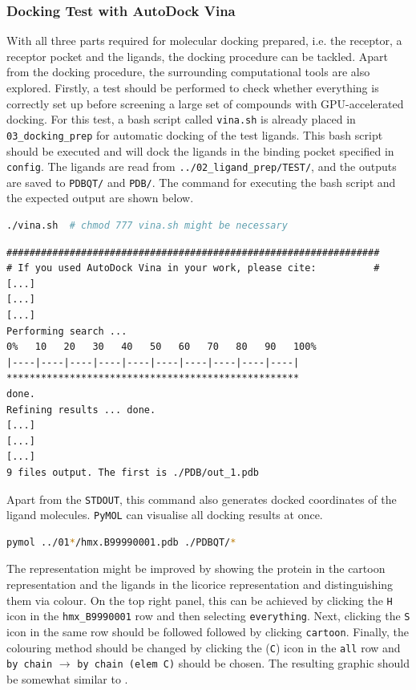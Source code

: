 \documentclass[9pt,tutorial]{livecoms}
\newcommand{\code}[1]{\colorbox{light-gray}{\texttt{#1}}}
\begin{document}
\subsubsection*{Docking Test with AutoDock Vina}
With all three parts required for molecular docking prepared, i.e. the receptor, a receptor pocket and the ligands, the docking procedure can be tackled. Apart from the docking procedure, the surrounding computational tools are also explored. Firstly, a test should be performed to check whether everything is correctly set up before screening a large set of compounds with GPU-accelerated docking. For this test, a bash script called \code{vina.sh} is already placed in \code{03\_docking\_prep} for automatic docking of the test ligands. This bash script should be executed and will dock the ligands in the binding pocket specified in \code{config}. The ligands are read from \code{../02\_ligand\_prep/TEST/}, and the outputs are saved to \code{PDBQT/} and \code{PDB/}. The command for executing the bash script and the expected output are shown below.
\begin{lstlisting}[language=bash]
./vina.sh  # chmod 777 vina.sh might be necessary
\end{lstlisting}
\begin{lstlisting}
#################################################################
# If you used AutoDock Vina in your work, please cite:          #
[...]
[...]
[...]
Performing search ...
0%   10   20   30   40   50   60   70   80   90   100%
|----|----|----|----|----|----|----|----|----|----|
***************************************************
done.
Refining results ... done.
[...]
[...]
[...]
9 files output. The first is ./PDB/out_1.pdb
\end{lstlisting}
Apart from the \texttt{STDOUT}, this command also generates docked coordinates of the ligand molecules. \texttt{PyMOL} can visualise all docking results at once.
\begin{lstlisting}[language=bash]
pymol ../01*/hmx.B99990001.pdb ./PDBQT/*
\end{lstlisting}

The representation might be improved by showing the protein in the cartoon representation and the ligands in the licorice representation and distinguishing them via colour. On the top right panel, this can be achieved by clicking the \code{H} icon in the \code{hmx\_B9990001} row and then selecting \code{everything}. Next, clicking the \code{S} icon in the same row should be followed followed by clicking \code{cartoon}. Finally, the colouring method should be changed by clicking the (\code{C}) icon in the \code{all} row and \code{by chain} $\xrightarrow{}$ \code{by chain (elem C)} should be chosen. The resulting graphic should be somewhat similar to . 
\end{document}
